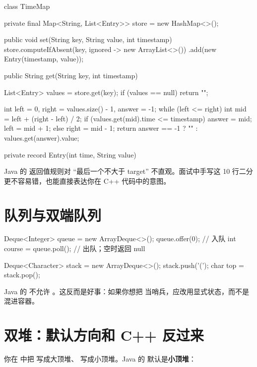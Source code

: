 \begin{javacode}
class TimeMap {
    private final Map<String, List<Entry>> store = new HashMap<>();

    public void set(String key, String value, int timestamp) {
        store.computeIfAbsent(key, ignored -> new ArrayList<>())
             .add(new Entry(timestamp, value));
    }

    public String get(String key, int timestamp) {
        List<Entry> values = store.get(key);
        if (values == null) return "";

        int left = 0, right = values.size() - 1, answer = -1;
        while (left <= right) {
            int mid = left + (right - left) / 2;
            if (values.get(mid).time <= timestamp) {
                answer = mid;
                left = mid + 1;
            } else {
                right = mid - 1;
            }
        }
        return answer == -1 ? "" : values.get(answer).value;
    }

    private record Entry(int time, String value) {}
}
\end{javacode}

\begin{transfer}
Java 的  返回值规则对 ``最后一个不大于 target'' 不直观。面试中手写这 10 行二分更不容易错，也能直接表达你在 C++ 代码中的意图。
\end{transfer}

\section{队列与双端队列}

\begin{javacode}
Deque<Integer> queue = new ArrayDeque<>();
queue.offer(0);                 // 入队
int course = queue.poll();      // 出队；空时返回 null

Deque<Character> stack = new ArrayDeque<>();
stack.push('(');
char top = stack.pop();
\end{javacode}

Java 的  不允许 。这反而是好事：如果你想把  当哨兵，应改用显式状态，而不是混进容器。

\section{双堆：默认方向和 C++ 反过来}

你在  中把  写成大顶堆、 写成小顶堆。Java 的  默认是\textbf{小顶堆}：

